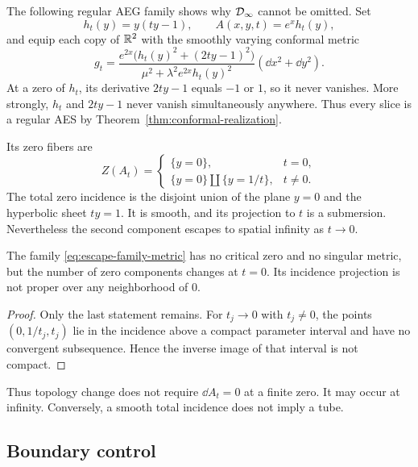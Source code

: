 The following regular AEG family shows why $\mathcal D_\infty$ cannot be omitted.  Set
\[
 h_t(y)=y(ty-1),
 \qquad
 A(x,y,t)=e^x h_t(y),
 \]
and equip each copy of $\mathbb{R}^2$ with the smoothly varying conformal metric
\begin{equation}
 g_t=
 \frac{e^{2x}\bigl(h_t(y)^2+(2ty-1)^2\bigr)}
      {\mu^2+\lambda^2e^{2x}h_t(y)^2}
 (\dd x^2+\dd y^2).
 \label{eq:escape-family-metric}
\end{equation}
At a zero of $h_t$, its derivative $2ty-1$ equals $-1$ or $1$, so it never
vanishes.  More strongly, $h_t$ and $2ty-1$ never vanish simultaneously anywhere.
Thus every slice is a regular AES by Theorem~\ref{thm:conformal-realization}.

Its zero fibers are
\begin{equation}
 Z(A_t)=
 \begin{cases}
  \{y=0\},&t=0,\\
  \{y=0\}\amalg\{y=1/t\},&t\ne0.
 \end{cases}
 \label{eq:escape-zero-fibers}
\end{equation}
The total zero incidence is the disjoint union of the plane $y=0$ and the
hyperbolic sheet $ty=1$.  It is smooth, and its projection to $t$ is a submersion.
Nevertheless the second component escapes to spatial infinity as $t\to0$.

\begin{proposition}
\label{prop:nonproper-escape}
The family \eqref{eq:escape-family-metric} has no critical zero and no singular
metric, but the number of zero components changes at $t=0$.  Its incidence
projection is not proper over any neighborhood of $0$.
\end{proposition}

\begin{proof}
Only the last statement remains.  For $t_j\to0$ with $t_j\ne0$, the points
$(0,1/t_j,t_j)$ lie in the incidence above a compact parameter interval and have
no convergent subsequence.  Hence the inverse image of that interval is not
compact.
\end{proof}

Thus topology change does not require $\dd A_t=0$ at a finite zero.  It may occur at
infinity.  Conversely, a smooth total incidence does not imply a tube.

\subsection{Boundary control}

